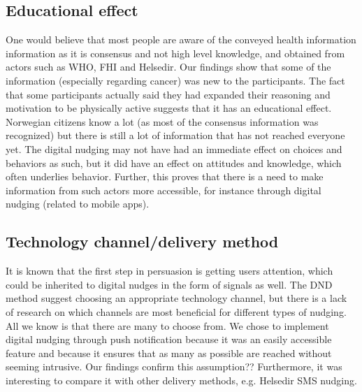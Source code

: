 \subsection{Educational effect}
One would believe that most people are aware of the conveyed health information information as it is consensus and not high level knowledge, and obtained from actors such as WHO, FHI and Helsedir. Our findings show that some of the information (especially regarding cancer) was new to the participants. The fact that some participants actually said they had expanded their reasoning and motivation to be physically active suggests that it has an educational effect. Norwegian citizens know a lot (as most of the consensus information was recognized) but there is still a lot of information that has not reached everyone yet. The digital nudging may not have had an immediate effect on choices and behaviors as such, but it did have an effect on attitudes and knowledge, which often underlies behavior. Further, this proves that there is a need to make information from such actors more accessible, for instance through digital nudging (related to mobile apps). 

\subsection{Technology channel/delivery method}
It is known that the first step in persuasion is getting users attention, which could be inherited to digital nudges in the form of signals as well. The DND method \cite{mirsch_making_2018} suggest choosing an appropriate technology channel, but there is a lack of research on which channels are most beneficial for different types of nudging.  All we know is that there are many to choose from. We chose to implement digital nudging through push notification because it was an easily accessible feature and because it ensures that as many as possible are reached without seeming intrusive. Our findings confirm this assumption?? Furthermore, it was interesting to compare it with other delivery methods, e.g. Helsedir SMS nudging. 

